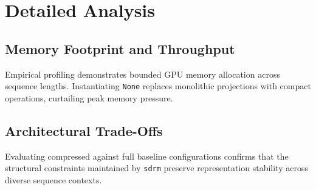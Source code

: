 \section{Detailed Analysis}

\subsection{Memory Footprint and Throughput}
Empirical profiling demonstrates bounded GPU memory allocation across sequence lengths. Instantiating \texttt{None} replaces monolithic projections with compact operations, curtailing peak memory pressure.

\subsection{Architectural Trade-Offs}
Evaluating compressed against full baseline configurations confirms that the structural constraints maintained by \texttt{sdrm} preserve representation stability across diverse sequence contexts.
